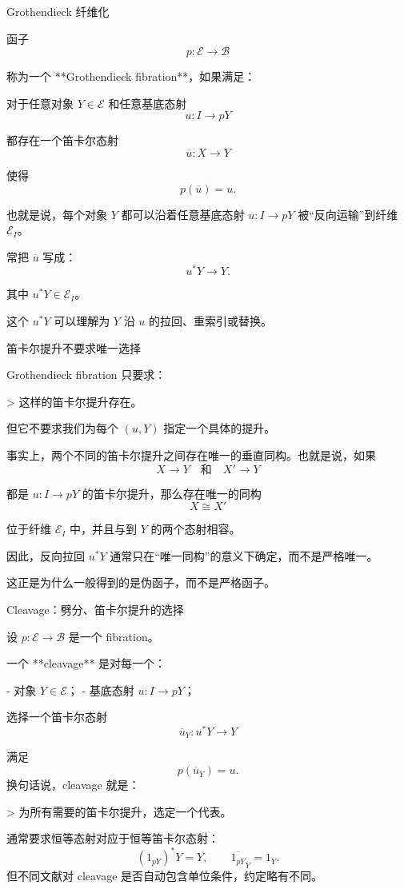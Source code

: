 \documentclass{beamer}
\begin{document}
\begin{frame}{Grothendieck 纤维化}
\begin{markdown}
函子
$$
p:\mathcal E\to\mathcal B
$$

称为一个 **Grothendieck fibration**，如果满足：

对于任意对象 $Y\in\mathcal E$ 和任意基底态射
$$
u:I\to pY
$$

都存在一个笛卡尔态射
$$
\overline u:X\to Y
$$

使得
$$
p(\overline u)=u.
$$

也就是说，每个对象 $Y$ 都可以沿着任意基底态射 $u:I\to pY$ 被“反向运输”到纤维 $\mathcal E_I$。

常把 $\overline u$ 写成：
$$
u^*Y\longrightarrow Y.
$$

其中 $u^*Y\in\mathcal E_I$。

这个 $u^*Y$ 可以理解为 $Y$ 沿 $u$ 的拉回、重索引或替换。
\end{markdown}
\end{frame}

\begin{frame}[fragile]{笛卡尔提升不要求唯一选择}
\begin{markdown}
Grothendieck fibration 只要求：

> 这样的笛卡尔提升存在。

但它不要求我们为每个 $(u,Y)$ 指定一个具体的提升。

事实上，两个不同的笛卡尔提升之间存在唯一的垂直同构。也就是说，如果
$$
X\to Y
\quad\text{和}\quad
X'\to Y
$$

都是 $u:I\to pY$ 的笛卡尔提升，那么存在唯一的同构
$$
X\cong X'
$$

位于纤维 $\mathcal E_I$ 中，并且与到 $Y$ 的两个态射相容。

因此，反向拉回 $u^*Y$ 通常只在“唯一同构”的意义下确定，而不是严格唯一。

这正是为什么一般得到的是伪函子，而不是严格函子。
\end{markdown}
\end{frame}

\begin{frame}[fragile]{Cleavage：劈分、笛卡尔提升的选择}
\begin{markdown}
设 $p:\mathcal E\to\mathcal B$ 是一个 fibration。

一个 **cleavage** 是对每一个：

- 对象 $Y\in\mathcal E$；
- 基底态射 $u:I\to pY$；

选择一个笛卡尔态射
$$
\overline u_Y:u^*Y\to Y
$$

满足
$$
p(\overline u_Y)=u.
$$
换句话说，cleavage 就是：

> 为所有需要的笛卡尔提升，选定一个代表。

通常要求恒等态射对应于恒等笛卡尔态射：
$$
(1_{pY})^*Y=Y,
\qquad
\overline{1_{pY}}_Y=1_Y.
$$
但不同文献对 cleavage 是否自动包含单位条件，约定略有不同。

\end{markdown}
\end{frame}
\end{document}
